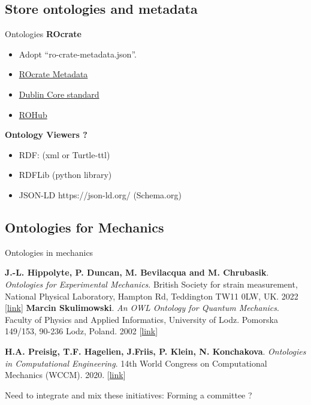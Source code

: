 \documentclass[10pt,compress,serif,aspectratio=169]{beamer}
\begin{document}


\subsection{Store ontologies and metadata}
\begin{frame}{Ontologies}
\textbf{ROcrate}
\begin{itemize}
  \item Adopt ``ro-crate-metadata.json''.
  \item \href{https://www.researchobject.org/ro-crate/specification/1.2-DRAFT/metadata}{ROcrate Metadata}
  \item \href{https://www.dublincore.org/specifications/dublin-core/dcmi-terms/}{Dublin Core standard}
  \item \href{https://www.rohub.org}{ROHub}
\end{itemize}
\vfill
\textbf{Ontology Viewers ?}
\begin{itemize}
  \item RDF: (xml or Turtle-ttl) 
  \item RDFLib (python library) 
  \item JSON-LD https://json-ld.org/ (Schema.org)
\end{itemize}
\end{frame}




\subsection{Ontologies for Mechanics}
\begin{frame}[t]{Ontologies in mechanics}

\textbf{J.-L. Hippolyte, P. Duncan, M. Bevilacqua and M. Chrubasik}. \textit{Ontologies for Experimental Mechanics}. British Society for strain measurement, National Physical Laboratory, Hampton Rd, Teddington TW11 0LW, UK. 2022 [\href{https://www.bssm.org/media/smjj4h43/ontologies-for-experimental-mechanics.pdf}{link}]
\vfill
\textbf{Marcin Skulimowski}. \textit{An OWL Ontology for Quantum Mechanics}. Faculty of Physics and Applied Informatics, University of Lodz. Pomorska 149/153, 90-236 Lodz, Poland. 2002 [\href{https://ceur-ws.org/Vol-614/owled2010_submission_18.pdf}{link}]
\vfill

\textbf{H.A. Preisig, T.F. Hagelien, J.Friis, P. Klein, N. Konchakova}. \textit{Ontologies in Computational Engineering}. 14th World Congress on Computational Mechanics (WCCM). 2020. [\href{https://www.scipedia.com/wd/images/d/dd/Draft_Content_689054725p3366.pdf}{link}]

\vfill
\pause
\begin{center}
\Large
  \alert{Need to integrate and mix these initiatives: Forming a committee ?}
\end{center}
\end{frame}
\end{document}
